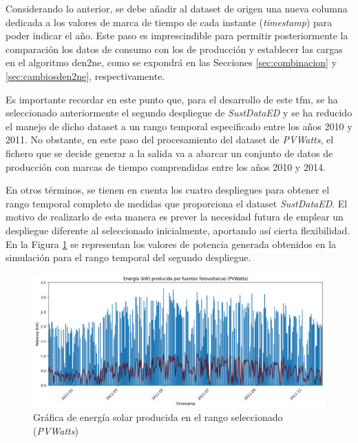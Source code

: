 \vspace{3mm}

Considerando lo anterior, se debe añadir al dataset de origen una nueva columna dedicada a los valores de marca de tiempo de cada instante (\textit{timestamp}) para poder indicar el año. Este paso es imprescindible para permitir posteriormente la comparación los datos de consumo con los de producción y establecer las cargas en el algoritmo \gls{den2ne}, como se expondrá en las Secciones \ref{sec:combinacion} y \ref{sec:cambiosden2ne}, respectivamente. 

\vspace{3mm}

Es importante recordar en este punto que, para el desarrollo de este \gls{tfm}, se ha seleccionado anteriormente el segundo despliegue de \textit{SustDataED} y se ha reducido el manejo de dicho dataset a un rango temporal especificado entre los años 2010 y 2011. No obstante, en este paso del procesamiento del dataset de \textit{PVWatts}, el fichero que se decide generar a la salida va a abarcar un conjunto de datos de producción con marcas de tiempo comprendidas entre los años 2010 y 2014. 

\vspace{3mm}

En otros términos, se tienen en cuenta los cuatro despliegues para obtener el rango temporal completo de medidas que proporciona el dataset \textit{SustDataED}. El motivo de realizarlo de esta manera es prever la necesidad futura de emplear un despliegue diferente al seleccionado inicialmente, aportando así cierta flexibilidad. En la Figura \ref{fig:solaryearpv} se representan los valores de potencia generada obtenidos en la simulación para el rango temporal del segundo despliegue.

\vspace{3mm}

\begin{figure}[H]
  \centering
  \includegraphics[width=1\textwidth]{img/diseno/matplotsolaryearpvwatts.png}
  \caption{Gráfica de energía solar producida en el rango seleccionado (\textit{PVWatts})}
  \label{fig:solaryearpv}
\end{figure}

